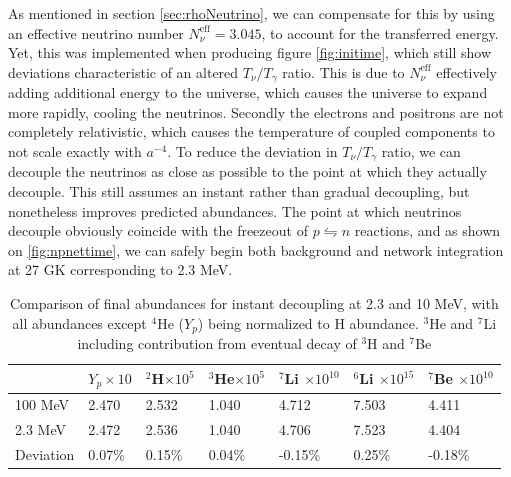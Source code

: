 As mentioned in section \ref{sec:rhoNeutrino}, we can compensate for this by using an effective neutrino number $N_\nu^\text{eff}=3.045$, to account for the transferred energy. Yet, this was implemented when producing figure \ref{fig:initime}, which still show deviations characteristic of an altered $T_\nu/T_\gamma$ ratio. This is due to $N_\nu^\text{eff}$ effectively adding additional energy to the universe, which causes the universe to expand more rapidly, cooling the neutrinos. Secondly the electrons and positrons are not completely relativistic, which causes the temperature of coupled components to not scale exactly with $a^{-4}$. To reduce the deviation in $T_\nu/T_\gamma$ ratio, we can decouple the neutrinos as close as possible to the point at which they actually decouple. This still assumes an instant rather than gradual decoupling, but nonetheless improves predicted abundances. The point at which neutrinos decouple obviously coincide with the freezeout of $p\leftrightharpoons n$ reactions, and as shown on \ref{fig:npnettime}, we can safely begin both background and network integration at 27 GK corresponding to 2.3 MeV. 
\begin{table}[ht]
    \begin{tabular}{l|llllll}
        & $Y_p \times 10$ & \hspace{-0.34em}$^{2}$H$ \times 10^{5}$ & \hspace{-0.34em}$^{3}$He$ \times 10^{5}$ & \hspace{-0.34em}$^{7}$Li $ \times 10^{10}$& \hspace{-0.34em}$^{6}$Li $ \times 10^{15}$& \hspace{-0.34em}$^{7}$Be $ \times 10^{10}$\\ \hline
    100 MeV & 2.470            & 2.532 & 1.040 & 4.712 & 7.503 & 4.411     \\ \hline
    2.3 MeV  & 2.472            & 2.536 & 1.040 & 4.706 & 7.523 & 4.404   \\ \hline
    Deviation & 0.07\%           & 0.15\% & 0.04\% & -0.15\% & 0.25\% & -0.18\%      
    \end{tabular}
    \caption{Comparison of final abundances for instant decoupling at 2.3 and 10 MeV, with all abundances except ${}^4$He ($Y_p$) being normalized to H abundance. ${}^3$He and ${}^7$Li including contribution from eventual decay of ${}^3$H and ${}^7$Be}
    \label{tab:earlylatedecoup}
\end{table}
